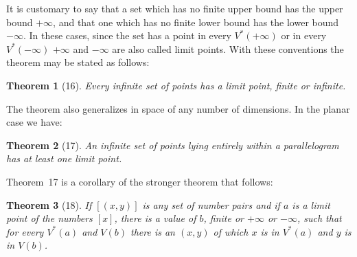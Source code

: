 \documentclass[a4paper,12pt]{book}[2004/02/16]
\providecommand{\hyperlink}[2]{#2}
\providecommand{\hypertarget}[2]{#2}
\theoremstyle{ilemma}
\theoremstyle{itheorem}
\newtheorem{theorem}{Theorem}
\theoremstyle{iother}
\theoremstyle{icorollary}
\theoremstyle{numcorollary}
\theoremstyle{idefinition}
\begin{document}
It is customary to say that a set which has no finite upper bound has
the upper bound $+\infty$, and that one which has no finite lower
bound has the lower bound $-\infty$. In these cases, since the set has
a point in every $V^*(+\infty)$ or in every $V^*(-\infty)$ $+\infty$
and $-\infty$ are also called limit points. With these conventions the
theorem may be stated as follows:

\begin{theorem}[16]\hypertarget{thm16}{}
Every infinite set of points has a limit point, finite or infinite.
\end{theorem}

The theorem also generalizes in space of any number of dimensions. In
the planar case we have:

\begin{theorem}[17]\hypertarget{thm17}{}
An infinite set of points lying entirely within a parallelogram has at
least one limit point.
\end{theorem}

Theorem~\hyperlink{thm17}{17} is a corollary of the stronger theorem that follows:

\begin{theorem}[18]\hypertarget{thm18}{}
If $[(x,y)]$ is any set of number pairs and if $a$ is a limit point of
the numbers $[x]$, there is a value of $b$, finite or $+\infty$ or
$-\infty$, such that for every $V^*(a)$ and $V(b)$ there is an $(x,y)$
of which $x$ is in $V^*(a)$ and $y$ is in $V(b)$.
\end{theorem}
\end{document}
